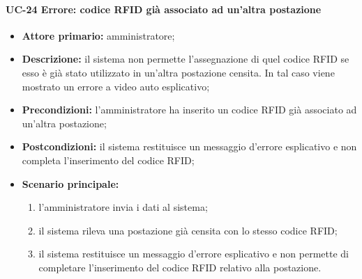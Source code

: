 \paragraph{UC-24 Errore: codice RFID già associato ad un'altra postazione}
    \begin{itemize}
	\item \textbf{Attore primario:} amministratore;
	\item \textbf{Descrizione:} il sistema non permette l'assegnazione di quel codice RFID se esso è già stato utilizzato in un'altra postazione censita. In tal caso viene mostrato un errore a video auto esplicativo;
	\item \textbf{Precondizioni:} l'amministratore ha inserito un codice RFID già associato ad un'altra postazione;
	\item \textbf{Postcondizioni:} il sistema restituisce un messaggio d'errore esplicativo e non completa l'inserimento del codice RFID;
	\item \textbf{Scenario principale:}
	      \begin{enumerate}
	      	      \item l'amministratore invia i dati al sistema;
		      \item il sistema rileva una postazione già censita con lo stesso codice RFID;
		      \item il sistema restituisce un messaggio d'errore esplicativo e non permette di completare l'inserimento del codice RFID relativo alla postazione.
	      \end{enumerate}
\end{itemize}


